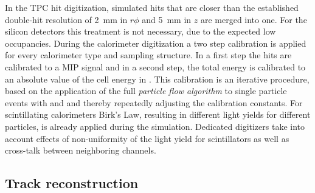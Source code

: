 In the TPC hit digitization, simulated hits that are closer than the established double-hit resolution
of 2~mm in $r\phi$ and 5~mm in $z$ are merged into one.
For the silicon detectors this treatment is not necessary, due to the expected low occupancies.
During the calorimeter digitization a two step calibration is applied for every calorimeter type and
sampling structure. In a first step the hits are calibrated to a MIP signal and in a second step,
the total energy is calibrated to an absolute value of the cell energy in \GeV.
This calibration is an iterative procedure, based on the application of the full
\emph{particle flow algorithm } to single particle events with \Pphoton and \PKz and thereby
repeatedly adjusting the calibration constants.
For scintillating calorimeters Birk's Law, resulting in different light yields for different
particles, is already applied during the simulation. Dedicated digitizers take into account
effects of non-uniformity of the light yield for scintillators as well as cross-talk between
neighboring channels.

\subsection{Track reconstruction}

